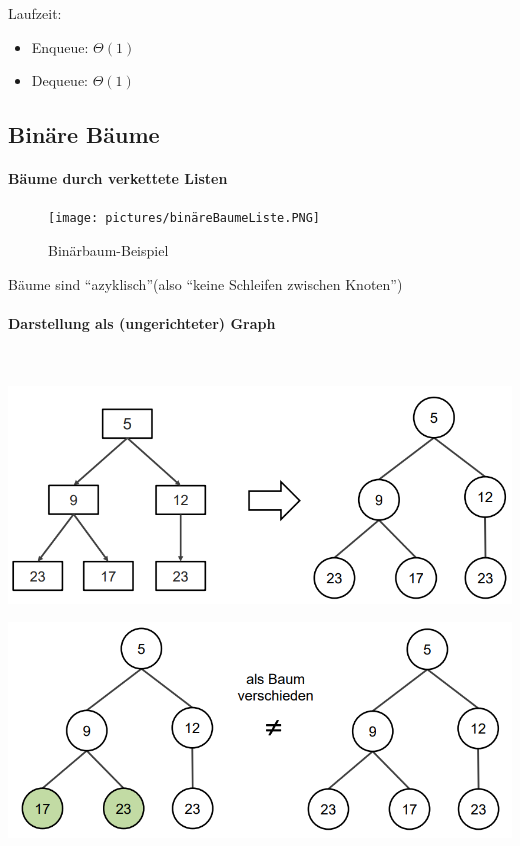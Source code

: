 \documentclass[
    ngerman,
    color=3b,
    load_common, %
    summary,
    boxarc,
]{tuda_summary}
\begin{document}
Laufzeit:
\begin{itemize}
    \item Enqueue: $\Theta(1)$
    \item Dequeue: $\Theta(1)$
\end{itemize}

\clearpage
\subsection{Binäre Bäume}\label{Binaere Baeume}
\paragraph{Bäume durch verkettete Listen}\mbox{}
\begin{figure}[h]
    \centering
    \texttt{[image: pictures/binäreBaumeListe.PNG]}
    \caption{Binärbaum-Beispiel}
\end{figure}
\FloatBarrier
Bäume sind \enquote{azyklisch}(also \enquote{keine Schleifen zwischen Knoten})

\paragraph{Darstellung als (ungerichteter) Graph}\mbox{}\\
\begin{minipage}[c]{0.49\textwidth}\mbox{}
    \includegraphics[width=\linewidth-5pt]{pictures/baumGraph1.PNG}
\end{minipage}
\begin{minipage}[c]{0.5\textwidth}\mbox{}
    \includegraphics[width=\linewidth-5pt]{pictures/baumGraph2.PNG}
\end{minipage}
\end{document}
